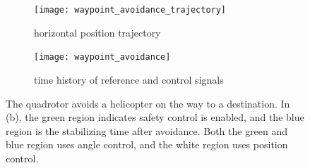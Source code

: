 \documentclass[journal,11pt,onecolumn,draftclsnofoot,]{IEEEtran}
\begin{document}
\begin{figure}
    \centering
    \begin{subfigure}[b]{0.45\columnwidth}
        \centering
        \texttt{[image: waypoint\_avoidance\_trajectory]}
        \caption{horizontal position trajectory}
        \label{fig:waypoint_avoidance_trajectory}
    \end{subfigure}
	\hfill
    \begin{subfigure}[b]{0.45\columnwidth}
        \centering
        \texttt{[image: waypoint\_avoidance]}
        \caption{time history of reference and control signals}
        \label{fig:waypoint_avoidance_signals}
    \end{subfigure}
    
    \caption{The quadrotor avoids a helicopter on the way to a destination. In (b), the green region indicates safety control is enabled, and the blue region is the stabilizing time after avoidance. Both the green and blue region uses angle control, and the white region uses position control.}
    \label{fig:waypoint_avoidance}
\end{figure}
\end{document}
